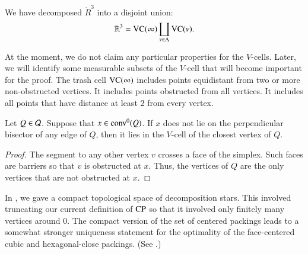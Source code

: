 We have decomposed $\ring{R}^3$ into a disjoint union:
    $$
    \mathbb{R}^3 = {\operatorname{VC}}(\infty)\coprod_{v\in\Lambda}{\operatorname{VC}}(v).
    $$

\begin{remark}\label{remark:pathology}
At the moment, we do not claim any particular properties for the
$V$-cells.  Later, we will identify some measurable subsets of the
$V$-cell that will become important for the proof.  The trash cell
${\operatorname{VC}}(\infty)$ includes points equidistant from two or more
non-obstructed vertices.  It includes points obstructed from all
vertices.  It includes all points that have distance at least $2$
from every vertex.
\end{remark}

\begin{lemma}\label{lemma:Q-divide}
Let $Q\in{\mathcal Q}$. Suppose that $x\in {\operatorname{conv}}^0(Q)$.
If $x$
does not lie on the perpendicular bisector of any edge of $Q$,
then it lies in the $V$-cell of the closest vertex of $Q$.
\end{lemma}

\begin{proof} The segment to any other vertex $v$ crosses a face of the
simplex. Such faces are barriers so that $v$ is obstructed at $x$.
Thus, the vertices of $Q$ are the only vertices that are not
obstructed at $x$.
\end{proof}


\label{sec:indexing} \label{sec:compact}





\begin{remark} In \cite{DCG}, we gave a compact topological
space of decomposition stars.  This involved truncating our current
definition of ${\operatorname{CP}}$ so that it involved only finitely many
vertices around $0$.  The compact version of the set of centered
packings leads to a somewhat stronger uniqueness statement for the
optimality of the face-centered cubic and hexagonal-close
packings.  (See \cite{DCG}.)
\end{remark}









